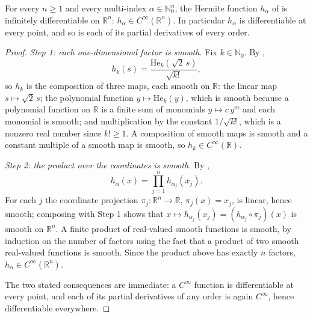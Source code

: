 \begin{lemma}
For every $n \geq 1$ and every multi-index $\alpha \in \mathbb{N}_0^n$, the Hermite
function $h_\alpha$ of  is infinitely differentiable on
$\mathbb{R}^n$: $h_\alpha \in C^\infty(\mathbb{R}^n)$.  In particular $h_\alpha$ is
differentiable at every point, and so is each of its partial derivatives of every
order.
\end{lemma}
\begin{proof}
\emph{Step 1: each one-dimensional factor is smooth.}
Fix $k \in \mathbb{N}_0$.  By ,
\[
  h_k(s) = \frac{\mathrm{He}_k(\sqrt2\, s)}{\sqrt{k!}} ,
\]
so $h_k$ is the composition of three maps, each smooth on $\mathbb{R}$:
the linear map $s \mapsto \sqrt2\,s$; the polynomial function
$y \mapsto \mathrm{He}_k(y)$, which is smooth because a polynomial function on
$\mathbb{R}$ is a finite sum of monomials $y \mapsto c\,y^m$ and each monomial is
smooth; and multiplication by the constant $1/\sqrt{k!}$, which is a nonzero real
number since $k! \geq 1$.  A composition of smooth maps is smooth and a constant
multiple of a smooth map is smooth, so $h_k \in C^\infty(\mathbb{R})$.

\emph{Step 2: the product over the coordinates is smooth.}
By ,
\[
  h_\alpha(x) = \prod_{j=1}^n h_{\alpha_j}(x_j) .
\]
For each $j$ the coordinate projection $\pi_j : \mathbb{R}^n \to \mathbb{R}$,
$\pi_j(x) = x_j$, is linear, hence smooth; composing with Step 1 shows that
$x \mapsto h_{\alpha_j}(x_j) = (h_{\alpha_j}\circ \pi_j)(x)$ is smooth on
$\mathbb{R}^n$.  A finite product of real-valued smooth functions is smooth, by
induction on the number of factors using the fact that a product of two smooth
real-valued functions is smooth.  Since the product above has exactly $n$ factors,
$h_\alpha \in C^\infty(\mathbb{R}^n)$.

The two stated consequences are immediate: a $C^\infty$ function is
differentiable at every point, and each of its partial derivatives of any order is
again $C^\infty$, hence differentiable everywhere.
\end{proof}
